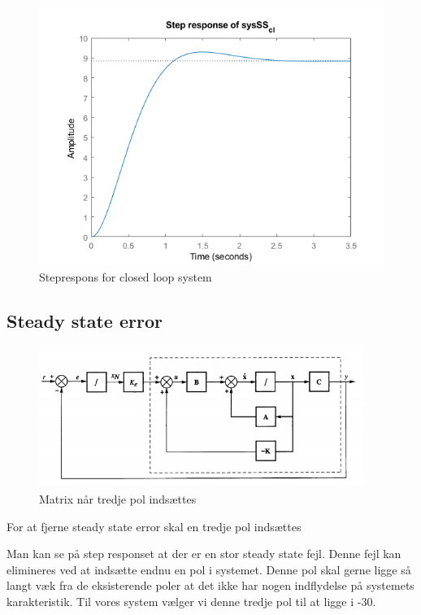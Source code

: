 \begin{figure}[H]
	\centering
	\includegraphics[width = 400pt]{Img/StepOfSysSS_cl.png}
	\caption{Steprespons for closed loop system}
	\label{fig:StepOfSysSS_cl}
\end{figure}



\subsection{Steady state error}

\begin{figure}[H]
	\centering
	\includegraphics[width = 300pt]{Img/SteadyState_blok.png}
	\caption{Matrix når tredje pol indsættes}
	\label{fig:SteadyStateMatrix}
\end{figure}
For at fjerne steady state error skal en tredje pol indsættes


Man kan se på step responset at der er en stor steady state fejl. Denne fejl kan elimineres ved at indsætte endnu en pol i systemet. Denne pol skal gerne ligge så langt væk fra de eksisterende poler at det ikke har nogen indflydelse på systemets karakteristik. Til vores system vælger vi denne tredje pol til at ligge i -30. 

